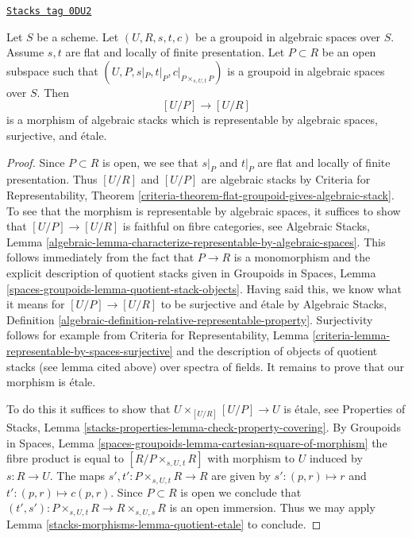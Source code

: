 \begin{lemma}
\label{stacks-morphisms-lemma-quasi-splitting-etale}
\href{https://stacks.math.columbia.edu/tag/0DU2}{\texttt{Stacks tag 0DU2}}

Let $S$ be a scheme.
Let $(U, R, s, t, c)$ be a groupoid in algebraic spaces over $S$.
Assume $s, t$ are flat and locally of finite presentation.
Let $P \subset R$ be an open subspace such that
$(U, P, s|_P, t|_P, c|_{P \times_{s, U, t} P})$ is a
groupoid in algebraic spaces over $S$. Then
$$
[U/P] \longrightarrow [U/R]
$$
is a morphism of algebraic stacks which
is representable by algebraic spaces, surjective, and \'etale.
\end{lemma}

\begin{proof}
Since $P \subset R$ is open, we see that $s|_P$ and $t|_P$
are flat and locally of finite presentation.
Thus $[U/R]$ and $[U/P]$ are algebraic stacks by
Criteria for Representability, Theorem
\ref{criteria-theorem-flat-groupoid-gives-algebraic-stack}.
To see that the morphism is representable by algebraic spaces,
it suffices to show that $[U/P] \to [U/R]$ is faithful on
fibre categories, see
Algebraic Stacks, Lemma
\ref{algebraic-lemma-characterize-representable-by-algebraic-spaces}.
This follows immediately from the fact that $P \to R$ is a monomorphism
and the explicit description of quotient stacks given in
Groupoids in Spaces, Lemma
\ref{spaces-groupoids-lemma-quotient-stack-objects}.
Having said this, we know what it means for
$[U/P] \to [U/R]$ to be surjective and \'etale by
Algebraic Stacks, Definition
\ref{algebraic-definition-relative-representable-property}.
Surjectivity follows for example from
Criteria for Representability,
Lemma \ref{criteria-lemma-representable-by-spaces-surjective}
and the description of objects of quotient stacks
(see lemma cited above) over spectra of fields.
It remains to prove that our morphism is \'etale.

\medskip\noindent
To do this it suffices to show that $U \times_{[U/R]} [U/P] \to U$
is \'etale, see Properties of Stacks, Lemma
\ref{stacks-properties-lemma-check-property-covering}.
By Groupoids in Spaces, Lemma
\ref{spaces-groupoids-lemma-cartesian-square-of-morphism}
the fibre product is equal to $[R/P \times_{s, U, t} R]$
with morphism to $U$ induced by $s : R \to U$.
The maps $s', t' : P \times_{s, U, t} R \to R$ are given by
$s' : (p, r) \mapsto r$ and $t' : (p, r) \mapsto c(p, r)$. Since
$P \subset R$ is open we conclude that
$(t', s') : P \times_{s, U, t} R \to R \times_{s, U, s} R$
is an open immersion.
Thus we may apply Lemma \ref{stacks-morphisms-lemma-quotient-etale}
to conclude.
\end{proof}

